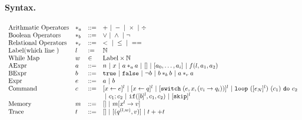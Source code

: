 \documentclass[a4paper,11pt]{article}
\begin{document}
\paragraph{Syntax.}
\[
\begin{array}{llll}
 \mbox{Arithmatic Operators} & *_a & ::= & + ~|~ - ~|~ \times 
%
~|~ \div \\  
  \mbox{Boolean Operators} & *_b & ::= & \lor ~|~ \land ~|~ \neg\\
   \mbox{Relational Operators} & *_r & ::= & < ~|~ \leq ~|~ == \\  
 \mbox{Label(which line )} & l & := & \mathbb{N} \\ 
 \mbox{While Map} & w & \in & \mbox{Label} \times \mathbb{N} \\
\mbox{AExpr} & \aexpr & ::= & 
	n ~|~ x ~|~ \aexpr *_a \aexpr ~|~ [] ~|~ [\aexpr_0, \dots, \aexpr_i] \sep f (l , \aexpr_1, \aexpr_2) \\
\mbox{BExpr} & \bexpr & ::= & 
	\etrue ~|~ \efalse  ~|~ \neg \bexpr
	 ~|~ \bexpr *_b \bexpr
	~|~ \aexpr *_r \aexpr \\
\mbox{Expr} & \expr & ::= & \aexpr \sep \bexpr \\	
\mbox{Command} & c & ::= &   [\assign x \expr]^{l} ~|~  [\assign x q]^{l}
%
~|~ {[\eswitch( \expr, x, (v_i \to  q_i))]^{l} \sep \eloop ~ ([\expr_N]^{l}) ~ (c_1) ~ \edo ~ c_2 }  \\ 
& & & ~|~  c_1 ; c_2 ~|~ \eif([\bexpr]^{l}, c_1, c_2) 
	 ~|~ [\eskip]^{l} 
	\\
\mbox{Memory} & m & ::= & [] ~|~ m[x^{l} \to v] \\
%
\mbox{Trace} & t & ::= & [] ~|~ [(q^{(l, w) }, v)] ~|~ t ++ t
\end{array}
\]
%
\end{document}
